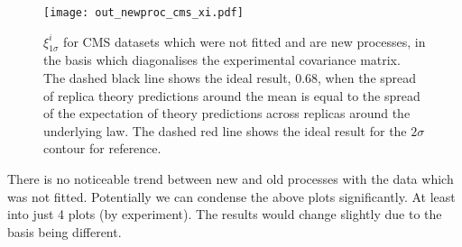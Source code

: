 \begin{figure}[ht]
    \centering
    \texttt{[image: out\_newproc\_cms\_xi.pdf]}
    \caption{$\xi_{1\sigma}^{i}$ for CMS datasets which were not fitted
    and are new processes, in the basis which diagonalises the experimental
    covariance matrix. The dashed black line shows the ideal result, 0.68, when
    the spread of replica theory predictions around the mean is equal to the
    spread of the expectation of theory predictions across replicas around the
    underlying law. The dashed red line shows the ideal result for the $2\sigma$
    contour for reference.}
    \label{fig:outnewcmsxi}
\end{figure}

\FloatBarrier

There is no noticeable trend between new and old processes with the data which
was not fitted. Potentially we can condense the above plots significantly. At
least into just 4 plots (by experiment). The results would change slightly
due to the basis being different.
